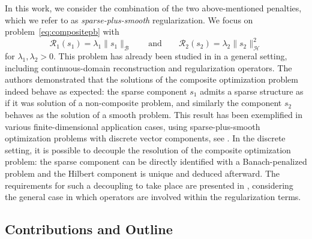 \documentclass[12pt]{article}
\begin{document}
    In this work, we consider the combination of the two above-mentioned penalties, which we refer to as \emph{sparse-plus-smooth} regularization. We focus on problem~\eqref{eq:compositepb} with
        \begin{equation*}
        \mathcal{R}_1 (s_1) = \lambda_1 \| s_1 \|_{\mathcal{B}} \qquad\text{and}\qquad \mathcal{R}_2 (s_2) = \lambda_2 \| s_2 \|_{\mathcal{H}}^2
    \end{equation*}
    for $\lambda_1, \lambda_2 > 0$. This problem has already been studied in \cite{debarre2021continuous} in a general setting, including continuous-domain reconstruction and regularization operators. The authors demonstrated that the solutions of the composite optimization problem indeed behave as expected: the sparse component $s_1$ admits a sparse structure as if it was solution of a non-composite problem, and similarly the component $s_2$ behaves as the solution of a smooth problem. This result has been exemplified in various finite-dimensional application cases, using sparse-plus-smooth optimization problems with discrete vector components, see \cite{mol2004,gholami2013balanced,debarnot2020learning}. In the discrete setting, it is possible to decouple the resolution of the composite optimization problem: the sparse component can be directly identified with a Banach-penalized problem and the Hilbert component is unique and deduced afterward. The requirements for such a decoupling to take place are presented in \cite{jarret2024decoupled}, considering the general case in which operators are involved within the regularization terms.



    \subsection{Contributions and Outline}
\end{document}

